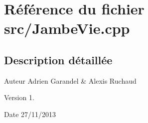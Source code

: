 \section{Référence du fichier src/\-Jambe\-Vie.cpp}
\label{_jambe_vie_8cpp}


\subsection{Description détaillée}
\begin{DoxyAuthor}{Auteur}
Adrien Garandel \& Alexis Ruchaud 
\end{DoxyAuthor}
\begin{DoxyVersion}{Version}
1. 
\end{DoxyVersion}
\begin{DoxyDate}{Date}
27/11/2013 
\end{DoxyDate}
